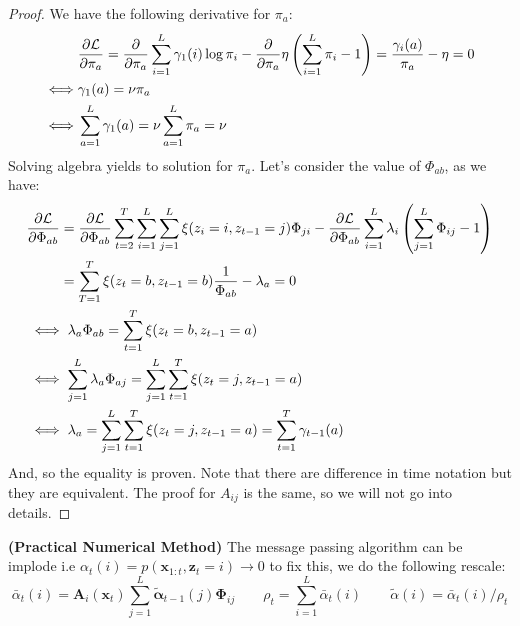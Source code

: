 \begin{proof}
    We have the following derivative for $\pi_a$:
    \begin{equation*}
    \begin{aligned}
        &\frac{\partial \mathcal{L}}{\partial \pi_a} = \frac{\partial}{\partial \pi_a}\sum^L_{i=1}\gamma_1(i)\log \pi_i - \frac{\partial}{\partial \pi_a} \eta\left( \sum^L_{i=1}\pi_i - 1 \right) = \frac{\gamma_i(a)}{\pi_a} - \eta = 0 \\
        \iff&\gamma_1(a) = \nu\pi_a \\
        \iff&\sum_{a=1}^L\gamma_1(a) = \nu\sum_{a=1}^L\pi_a = \nu \\
    \end{aligned}
    \end{equation*}
    Solving algebra yields to solution for $\pi_a$. Let's consider the value of $\Phi_{ab}$, as we have:
    \begin{equation*}
    \begin{aligned}
        &\frac{\partial \mathcal{L}}{\partial \Phi_{ab}} \begin{aligned}[t]
            &=\frac{\partial \mathcal{L}}{\partial \Phi_{ab}} \sum^T_{t=2} \sum^L_{i=1}\sum_{j=1}^L\xi(z_i = i, z_{t-1}=j) \Phi_{ji} -\frac{\partial \mathcal{L}}{\partial \Phi_{ab}} \sum^L_{i=1}\lambda_i\left( \sum^L_{j=1}\Phi_{ij} - 1 \right) \\
            &=\sum^T_{T=1}\xi(z_t = b, z_{t-1}=b)\frac{1}{\Phi_{ab}} - \lambda_a =0 
        \end{aligned} \\
        &\iff \lambda_a \Phi_{ab} = \sum^T_{t=1}\xi(z_t = b, z_{t-1} = a) \\
        &\iff \sum^L_{j=1}\lambda_a \Phi_{aj} =  \sum^L_{j=1}\sum^T_{t=1}\xi(z_t = j, z_{t-1} = a) \\
        &\iff \lambda_a 
        \begin{aligned}[t]
            &= \sum^L_{j=1}\sum^T_{t=1}\xi(z_t = j, z_{t-1} = a) = \sum^T_{t=1}\gamma_{t-1}(a) \\
        \end{aligned}
    \end{aligned} 
    \end{equation*}
    And, so the equality is proven. Note that there are difference in time notation but they are equivalent. The proof for $A_{ij}$ is the same, so we will not go into details.
\end{proof}

\begin{remark}{\textbf{(Practical Numerical Method)}}
    The message passing algorithm can be implode i.e $\alpha_t(i) = p(\boldsymbol x_{1:t}, \boldsymbol z_t = i) \rightarrow 0$ to fix this, we do the following rescale:
    \begin{equation*}
        \bar{\alpha}_t(i) = \boldsymbol A_i(\boldsymbol x_t)\sum_{j=1}^L \tilde{\boldsymbol \alpha}_{t-1}(j)\boldsymbol \Phi_{ij} \qquad \rho_t = \sum^L_{i=1}\bar{\alpha}_t(i) \qquad \tilde{\alpha}(i) = \bar{\alpha}_t(i)/\rho_t
    \end{equation*}
\end{remark}

